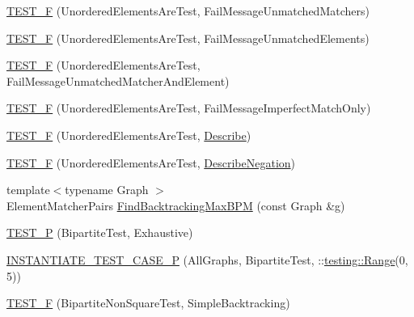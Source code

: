 \begin{DoxyCompactItemize}
\mbox{\hyperlink{namespacetesting_1_1gmock__matchers__test_a11b785087491ae58b074fa8dbbc88cd4}{T\+E\+S\+T\+\_\+F}} (Unordered\+Elements\+Are\+Test, Fail\+Message\+Unmatched\+Matchers)
\item 
\mbox{\hyperlink{namespacetesting_1_1gmock__matchers__test_a6dfb50dcbb543de71fcc4d09844d36b3}{T\+E\+S\+T\+\_\+F}} (Unordered\+Elements\+Are\+Test, Fail\+Message\+Unmatched\+Elements)
\item 
\mbox{\hyperlink{namespacetesting_1_1gmock__matchers__test_a2395b7e71b7ad50af72caa61c10e6898}{T\+E\+S\+T\+\_\+F}} (Unordered\+Elements\+Are\+Test, Fail\+Message\+Unmatched\+Matcher\+And\+Element)
\item 
\mbox{\hyperlink{namespacetesting_1_1gmock__matchers__test_ac70f9f9717f35352349b076654094f6a}{T\+E\+S\+T\+\_\+F}} (Unordered\+Elements\+Are\+Test, Fail\+Message\+Imperfect\+Match\+Only)
\item 
\mbox{\hyperlink{namespacetesting_1_1gmock__matchers__test_a937f4d835023cd6322eb7d32596f3f43}{T\+E\+S\+T\+\_\+F}} (Unordered\+Elements\+Are\+Test, \mbox{\hyperlink{namespacetesting_1_1gmock__matchers__test_a738a538e1705ea49670aeb3ed25108e6}{Describe}})
\item 
\mbox{\hyperlink{namespacetesting_1_1gmock__matchers__test_a3c4c92b68a08c5d541e46ed367e216ab}{T\+E\+S\+T\+\_\+F}} (Unordered\+Elements\+Are\+Test, \mbox{\hyperlink{namespacetesting_1_1gmock__matchers__test_a96c18b92dede79060a7303fe5d178faf}{Describe\+Negation}})
\item 
{\footnotesize template$<$typename Graph $>$ }\\Element\+Matcher\+Pairs \mbox{\hyperlink{namespacetesting_1_1gmock__matchers__test_a09321a8d4a4c40ab1e369fbdf92b0414}{Find\+Backtracking\+Max\+B\+PM}} (const Graph \&g)
\item 
\mbox{\hyperlink{namespacetesting_1_1gmock__matchers__test_a20589d957fcfe5399e249084dbc23e82}{T\+E\+S\+T\+\_\+P}} (Bipartite\+Test, Exhaustive)
\item 
\mbox{\hyperlink{namespacetesting_1_1gmock__matchers__test_a16ff96ce4f97da6215f889baccd57e87}{I\+N\+S\+T\+A\+N\+T\+I\+A\+T\+E\+\_\+\+T\+E\+S\+T\+\_\+\+C\+A\+S\+E\+\_\+P}} (All\+Graphs, Bipartite\+Test, \+::\mbox{\hyperlink{namespacetesting_a4f2c9978ad0c764f57e0cbd6f72cb540}{testing\+::\+Range}}(0, 5))
\item 
\mbox{\hyperlink{namespacetesting_1_1gmock__matchers__test_a7d2395b1cb6a90bdc8d46ae06f99f6c7}{T\+E\+S\+T\+\_\+F}} (Bipartite\+Non\+Square\+Test, Simple\+Backtracking)
\item 

\end{DoxyCompactItemize}
